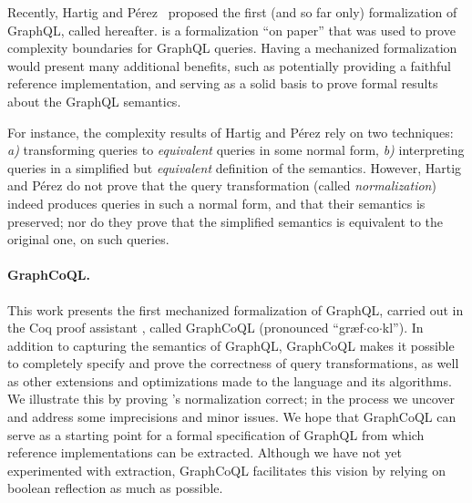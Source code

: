 Recently, Hartig and Pérez~\cite{gqlph} proposed the first (and so far only) formalization of GraphQL, called \HP{} hereafter. 
\HP{} is a formalization ``on paper'' that was used to prove complexity boundaries for GraphQL queries. Having a mechanized formalization would present many additional benefits, such as potentially providing a faithful reference implementation, and serving as a solid basis to prove formal results about the GraphQL semantics. 

For instance, the complexity results of Hartig and Pérez rely on two techniques: {\em a)} transforming queries to {\em equivalent} queries in some  normal form, {\em b)} interpreting queries in a simplified but {\em equivalent} definition of the semantics. However, Hartig and Pérez do not prove that the query transformation (called {\em normalization}) indeed produces queries in such a normal form, and that their semantics is preserved; nor do they prove that the simplified semantics is equivalent to the original one, on such queries.



\paragraph{GraphCoQL.} This work presents the first mechanized formalization of GraphQL, carried out in the Coq proof assistant , called GraphCoQL (pronounced ``græf$\cdot$co$\cdot$k{\pmschwa}l''). In addition to capturing the semantics of GraphQL, GraphCoQL makes it possible to completely specify and prove the correctness of query transformations, as well as other extensions and optimizations made to the language and its algorithms. We illustrate this by proving \HP{}'s normalization correct; in the process we uncover and address some imprecisions and minor issues.
We hope that GraphCoQL can serve as a starting point for a formal specification of GraphQL from which reference implementations can be extracted. Although we have not yet experimented with extraction, GraphCoQL facilitates this vision by relying on boolean reflection as much as possible.

